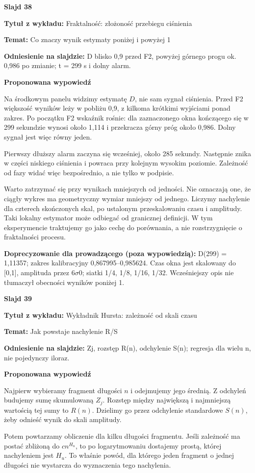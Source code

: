\documentclass[a4paper,11pt]{article}
\newcommand{\NumerSlajdu}{1}
\newcommand{\Komentarz}[3]{%
  \gdef\NumerSlajdu{#1}%
  {\Large\bfseries Slajd #1\par}\smallskip
  \textbf{Tytuł z wykładu:} #2\par
  \textbf{Temat:} #3\par\medskip
}
\begin{document}
\Komentarz{38}{Fraktalność: złożoność przebiegu ciśnienia}{Co znaczy wynik estymaty poniżej i powyżej 1}
{\small\color{black!65}\textbf{Odniesienie na slajdzie:} D blisko 0,9 przed F2, powyżej górnego progu ok. 0,986 po zmianie; t = 299 s i dolny alarm.\par}
\medskip
\textbf{Proponowana wypowiedź}\par
Na środkowym panelu widzimy estymatę $D$, nie sam sygnał ciśnienia. Przed F2 większość wyników leży w pobliżu 0,9, z kilkoma krótkimi wyjściami ponad zakres. Po początku F2 wskaźnik rośnie: dla zaznaczonego okna kończącego się w 299 sekundzie wynosi około 1,114 i przekracza górny próg około 0,986. Dolny sygnał jest więc równy jeden.

Pierwszy dłuższy alarm zaczyna się wcześniej, około 285 sekundy. Następnie znika w części niskiego ciśnienia i powraca przy kolejnym wysokim poziomie. Zależność od fazy widać więc bezpośrednio, a nie tylko w podpisie.

Warto zatrzymać się przy wynikach mniejszych od jedności. Nie oznaczają one, że ciągły wykres ma geometryczny wymiar mniejszy od jednego. Liczymy nachylenie dla czterech skończonych skal, po ustalonym przeskalowaniu czasu i amplitudy. Taki lokalny estymator może odbiegać od granicznej definicji. W tym eksperymencie traktujemy go jako cechę do porównania, a nie rozstrzygnięcie o fraktalności procesu.

{\small\color{black!65}\textbf{Doprecyzowanie dla prowadzącego (poza wypowiedzią):} D(299) = 1,11357; zakres kalibracyjny 0,867995–0,985624. Czas okna jest skalowany do [0,1], amplituda przez 6\ensuremath{\sigma}0; siatki 1/4, 1/8, 1/16, 1/32. Wcześniejszy opis nie tłumaczył obecności wyników poniżej 1.\par}
\clearpage

\Komentarz{39}{Wykładnik Hursta: zależność od skali czasu}{Jak powstaje nachylenie R/S}
{\small\color{black!65}\textbf{Odniesienie na slajdzie:} Zj, rozstęp R(n), odchylenie S(n); regresja dla wielu n, nie pojedynczy iloraz.\par}
\medskip
\textbf{Proponowana wypowiedź}\par
Najpierw wybieramy fragment długości $n$ i odejmujemy jego średnią. Z odchyleń budujemy sumę skumulowaną $Z_j$. Rozstęp między największą i najmniejszą wartością tej sumy to $R(n)$. Dzielimy go przez odchylenie standardowe $S(n)$, żeby odnieść wynik do skali amplitudy.

Potem powtarzamy obliczenie dla kilku długości fragmentu. Jeśli zależność ma postać zbliżoną do $c n^{H_u}$, to po logarytmowaniu dostajemy prostą, której nachyleniem jest $H_u$. To właśnie powód, dla którego jeden fragment o jednej długości nie wystarcza do wyznaczenia tego nachylenia.
\end{document}
